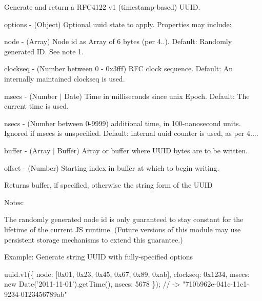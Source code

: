 Generate and return a R\+F\+C4122 v1 (timestamp-\/based) U\+U\+ID.


\begin{DoxyItemize}
\item {\ttfamily options} -\/ (Object) Optional uuid state to apply. Properties may include\+:
\begin{DoxyItemize}
\item {\ttfamily node} -\/ (Array) Node id as Array of 6 bytes (per 4..). Default\+: Randomly generated ID. See note 1.
\item {\ttfamily clockseq} -\/ (Number between 0 -\/ 0x3fff) R\+FC clock sequence. Default\+: An internally maintained clockseq is used.
\item {\ttfamily msecs} -\/ (Number $\vert$ Date) Time in milliseconds since unix Epoch. Default\+: The current time is used.
\item {\ttfamily nsecs} -\/ (Number between 0-\/9999) additional time, in 100-\/nanosecond units. Ignored if {\ttfamily msecs} is unspecified. Default\+: internal uuid counter is used, as per 4....
\end{DoxyItemize}
\item {\ttfamily buffer} -\/ (Array $\vert$ Buffer) Array or buffer where U\+U\+ID bytes are to be written.
\item {\ttfamily offset} -\/ (Number) Starting index in {\ttfamily buffer} at which to begin writing.
\end{DoxyItemize}

Returns {\ttfamily buffer}, if specified, otherwise the string form of the U\+U\+ID

Notes\+:


\begin{DoxyEnumerate}
\item The randomly generated node id is only guaranteed to stay constant for the lifetime of the current JS runtime. (Future versions of this module may use persistent storage mechanisms to extend this guarantee.)
\end{DoxyEnumerate}

Example\+: Generate string U\+U\+ID with fully-\/specified options


\begin{DoxyCode}
uuid.v1(\{
  node: [0x01, 0x23, 0x45, 0x67, 0x89, 0xab],
  clockseq: 0x1234,
  msecs: new Date('2011-11-01').getTime(),
  nsecs: 5678
\});   // -> "710b962e-041c-11e1-9234-0123456789ab"
\end{DoxyCode}


